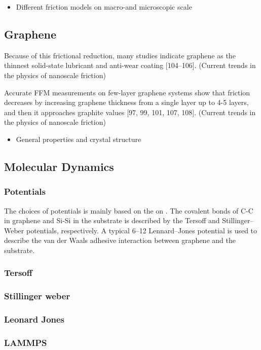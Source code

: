 \begin{itemize}
  \item Different friction models on macro-and microscopic scale
\end{itemize}
\subsection{Graphene}
Because of this frictional reduction, many studies indicate graphene as the thinnest solid-state lubricant and anti-wear coating [104–106].
(Current trends in the physics of nanoscale friction)


Accurate FFM measurements on few-layer graphene systems show that friction decreases by increasing graphene thickness from a single layer up
to 4-5 layers, and then it approaches graphite values [97, 99, 101, 107, 108]. (Current trends in the physics of nanoscale friction)



\begin{itemize}
  \item General properties and crystal structure
\end{itemize}
\subsection{Molecular Dynamics}
\subsubsection{Potentials}
The choices of potentials is mainly based on the on \cite{li_evolving_2016}. The covalent bonds of C-C in graphene and Si-Si in the substrate is described by the Tersoff and Stillinger–Weber potentials, respectively. A typical 6–12 Lennard–Jones potential is used to describe the van der Waals adhesive interaction between graphene and the substrate. 

\subsubsection{Tersoff}
\subsubsection{Stillinger weber}
\subsubsection{Leonard Jones}
\subsubsection{LAMMPS}
